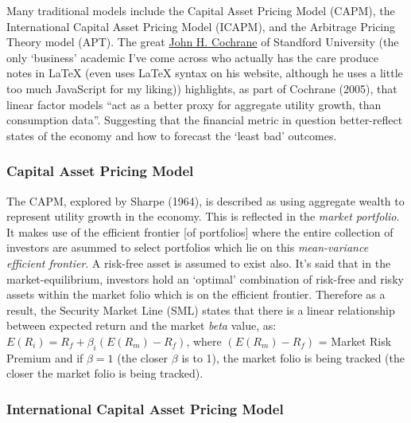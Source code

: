 \documentclass[11pt, english]{article}
\begin{document}
		Many traditional models include the Capital Asset Pricing Model (CAPM), the International Capital Asset Pricing Model (ICAPM), and the Arbitrage Pricing Theory model (APT). The great \href{https://www.johnhcochrane.com/}{John H. Cochrane} of Standford University (the only `business' academic I've come across who actually has the care produce notes in {\LaTeX} (even uses {\LaTeX} syntax on his website, although he uses a little too much JavaScript for my liking)) highlights, as part of Cochrane (2005), that linear factor models ``act as a better proxy for aggregate utility growth, than consumption data''. Suggesting that the financial metric in question better-reflect states of the economy and how to forecast the `least bad' outcomes.
                
		\subsubsection*{Capital Asset Pricing Model}

        The CAPM, explored by Sharpe (1964), is described as using aggregate wealth to represent  utility growth in the economy. This is reflected in the \textit{market portfolio}. It makes use of the efficient frontier [of portfolios] where the entire collection of investors are asummed to select portfolios which lie on this \textit{mean-variance efficient frontier}. A risk-free asset is assumed to exist also. It's said that in the market-equilibrium, investors hold an `optimal' combination of risk-free and risky assets within the market folio which is on the efficient frontier. Therefore as a result, the Security Market Line (SML) states that there is a linear relationship between expected return and the market \textit{beta} value, as: $E(R_i)=R_f+\beta_i(E(R_m)-R_f)$, where $(E(R_m)-R_f)$ = Market Risk Premium and if $\beta=1$ (the closer $\beta$ is to 1), the market folio is being tracked (the closer the market folio is being tracked).
        
		\subsubsection*{International Capital Asset Pricing Model}
\end{document}
